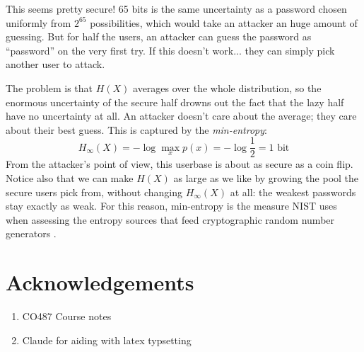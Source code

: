 \documentclass[a4paper,12pt]{article}
\begin{document}
This seems pretty secure! 65 bits is the same uncertainty as a password chosen uniformly from $2^{65}$ possibilities, which would take an attacker an huge amount of guessing.
But for half the users, an attacker can guess the password as ``password'' on the very first try. If this doesn't work... they can simply pick another user to attack.

The problem is that $H(X)$ averages over the whole distribution, so the enormous uncertainty of the secure half drowns out the fact that the lazy half have no uncertainty at all.
An attacker doesn't care about the average; they care about their best guess.
This is captured by the \emph{min-entropy}:
$$H_\infty(X) = -\log \max_x p(x) = -\log\frac{1}{2} = 1 \text{ bit}$$
From the attacker's point of view, this userbase is about as secure as a coin flip.
Notice also that we can make $H(X)$ as large as we like by growing the pool the secure users pick from, without changing $H_\infty(X)$ at all: the weakest passwords stay exactly as weak.
For this reason, min-entropy is the measure NIST uses when assessing the entropy sources that feed cryptographic random number generators \cite{nist80090b}.

\section{Acknowledgements}

\begin{enumerate}
    \item CO487 Course notes
    \item Claude for aiding with latex typsetting
\end{enumerate}



\end{document}
